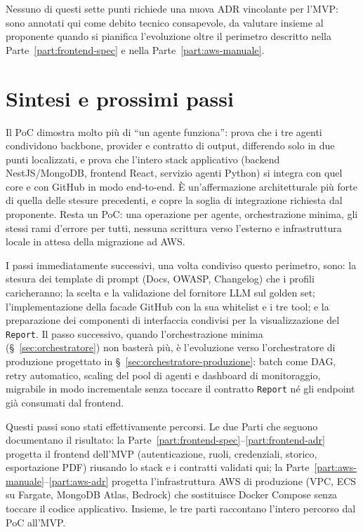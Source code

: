 \documentclass[11pt,a4paper]{article}
\begin{document}
Nessuno di questi sette punti richiede una nuova ADR vincolante per l'MVP: sono annotati qui come debito tecnico consapevole, da valutare insieme al proponente quando si pianifica l'evoluzione oltre il perimetro descritto nella Parte~\ref{part:frontend-spec} e nella Parte~\ref{part:aws-manuale}.

\section{Sintesi e prossimi passi}
\label{sec:sintesi}

Il PoC dimostra molto più di ``un agente funziona'': prova che i tre agenti condividono backbone, provider e contratto di output, differendo solo in due punti localizzati, e prova che l'intero stack applicativo (backend NestJS/MongoDB, frontend React, servizio agenti Python) si integra con quel core e con GitHub in modo end-to-end. È un'affermazione architetturale più forte di quella delle stesure precedenti, e copre la soglia di integrazione richiesta dal proponente. Resta un PoC: una operazione per agente, orchestrazione minima, gli stessi rami d'errore per tutti, nessuna scrittura verso l'esterno e infrastruttura locale in attesa della migrazione ad AWS.

I passi immediatamente successivi, una volta condiviso questo perimetro, sono: la stesura dei template di prompt (Docs, OWASP, Changelog) che i profili caricheranno; la scelta e la validazione del fornitore LLM sul golden set; l'implementazione della facade GitHub con la sua whitelist e i tre tool; e la preparazione dei componenti di interfaccia condivisi per la visualizzazione del \texttt{Report}. Il passo successivo, quando l'orchestrazione minima (\S~\ref{sec:orchestratore}) non basterà più, è l'evoluzione verso l'orchestratore di produzione progettato in \S~\ref{sec:orchestratore-produzione}: batch come DAG, retry automatico, scaling del pool di agenti e dashboard di monitoraggio, migrabile in modo incrementale senza toccare il contratto \texttt{Report} né gli endpoint già consumati dal frontend.

Questi passi sono stati effettivamente percorsi. Le due Parti che seguono documentano il risultato: la Parte~\ref{part:frontend-spec}--\ref{part:frontend-adr} progetta il frontend dell'MVP (autenticazione, ruoli, credenziali, storico, esportazione PDF) riusando lo stack e i contratti validati qui; la Parte~\ref{part:aws-manuale}--\ref{part:aws-adr} progetta l'infrastruttura AWS di produzione (VPC, ECS su Fargate, MongoDB Atlas, Bedrock) che sostituisce Docker Compose senza toccare il codice applicativo. Insieme, le tre parti raccontano l'intero percorso dal PoC all'MVP.
\end{document}
